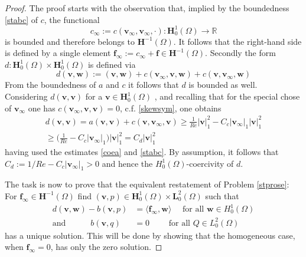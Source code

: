 \documentclass[a4paper,10pt,BCOR=15mm]{scrbook}
\providecommand{\abs}[1]{\lvert#1\rvert}
\providecommand{\dupa}[2]{\langle #1,#2 \rangle}
\begin{document}
\begin{proof}
The proof starts with the observation that, implied by the boundedness \eqref{stabc} of $c$, the functional 
\begin{equation*}
 c_\infty:=c(\mathbf v_\infty,\mathbf v_\infty,\cdot):\mathbf H_0 ^1(\Omega) \rightarrow \mathbb R 
\end{equation*}
is bounded and therefore belongs to $\mathbf H ^{-1}(\Omega)$. It follows that the right-hand side is defined by a single element $\mathbf f_\infty := c_\infty + \mathbf f \in \mathbf H ^{-1}(\Omega)$.
Secondly the form $d:\mathbf H_0 ^1(\Omega)\times\mathbf H_0 ^1(\Omega)$ is defined via
\begin{equation*}
 d(\mathbf v, \mathbf w) := (\mathbf v, \mathbf w) +  c(\mathbf v_\infty,  \mathbf v, \mathbf w)+c(\mathbf v,\mathbf v_\infty, \mathbf w)
\end{equation*}
From the boundedness of $a$ and $c$ it follows that $d$ is bounded as well. Considering $d(\mathbf v,\mathbf v)$ for a $\mathbf v \in \mathbf H_0 ^1(\Omega)$ , and recalling that for the special chose of $\mathbf v_\infty$ one has $c(\mathbf v_\infty,  \mathbf v, \mathbf v)=0$, c.f. \eqref{skewsym}, one obtains 
\begin{align*}
 d(\mathbf v,\mathbf v) = a(\mathbf v,\mathbf v) + c(\mathbf v,\mathbf v_\infty,\mathbf v) \geq \frac{1}{Re} \abs{\mathbf v}_1^2 - C_c \abs{\mathbf v_\infty}_1 \abs{\mathbf v}_1^2 \\
\geq \biggl( \frac{1}{Re} - C_c \abs{\mathbf v_\infty}_1\biggr)  \abs{\mathbf v}_1^2 = C_d \abs{\mathbf v}_1^2
\end{align*}
having used the estimates \eqref{coea} and \eqref{stabc}. By assumption, it follows that $C_d:=1/Re  - C_c \abs{\mathbf v_\infty}_1>0$ and hence the $H_0 ^1(\Omega) $-coercivity of $d$. 

The task is now to prove that the equivalent restatement of Problem \ref{stprose}: For $\mathbf f_\infty \in \mathbf H ^{-1}(\Omega)$ find $(\mathbf v,p) \in \mathbf H_0 ^1(\Omega) \times \mathbf L_0^2(\Omega)$ such that
\begin{subequations}\label{doseen}
\begin{align}
 d(\mathbf v, \mathbf w) - b(\mathbf v, p) &= \dupa{\mathbf f_\infty}{\mathbf w} \quad \text{ for all  } \mathbf w \in H_0 ^1(\Omega)  \label{doseena} \\
\text{and} \quad  \quad \quad b(\mathbf v,q)&=0 \quad \quad \text{ for all  } Q \in L_0^2(\Omega) 
\end{align}
\end{subequations}
has a unique solution. This will be done by showing that the homogeneous case, when $\mathbf f_\infty=0$, has only the zero solution. 


\end{proof}
\end{document}
